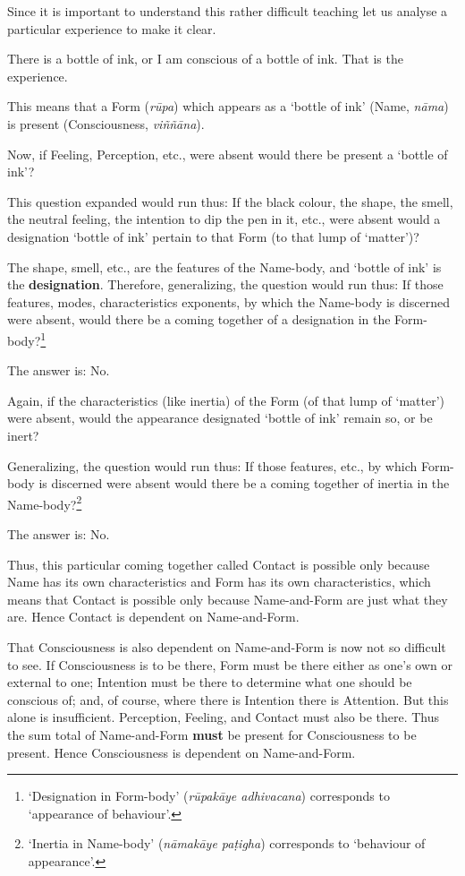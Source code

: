 Since it is important to understand this rather difficult teaching let us analyse a particular experience to make it clear.

There is a bottle of ink, or I am conscious of a bottle of ink. That is the experience.

This means that a Form (\emph{rūpa}) which appears as a `bottle of ink' (Name, \emph{nāma}) is present (Consciousness, \emph{viññāna}).

Now, if Feeling, Perception, etc., were absent would there be present a `bottle of ink'?

This question expanded would run thus: If the black colour, the shape, the smell, the neutral feeling, the intention to dip the pen in it, etc., were absent would a designation `bottle of ink' pertain to that Form (to that lump of `matter')?

The shape, smell, etc., are the features of the Name-body, and `bottle of ink' is the \textbf{designation}. Therefore, generalizing, the question would run thus: If those features, modes, characteristics exponents, by which the Name-body is discerned were absent, would there be a coming together of a designation in the Form-body?\footnote{`Designation in Form-body' (\emph{rūpakāye adhivacana}) corresponds to `appearance of behaviour'.}

The answer is: No.

Again, if the characteristics (like inertia) of the Form (of that lump of `matter') were absent, would the appearance designated `bottle of ink' remain so, or be inert?

Generalizing, the question would run thus: If those features, etc., by which Form-body is discerned were absent would there be a coming together of inertia in the Name-body?\footnote{`Inertia in Name-body' (\emph{nāmakāye paṭigha}) corresponds to `behaviour of appearance'.}

The answer is: No.

Thus, this particular coming together called Contact is possible only because Name has its own characteristics and Form has its own characteristics, which means that Contact is possible only because Name-and-Form are just what they are. Hence Contact is dependent on Name-and-Form.

That Consciousness is also dependent on Name-and-Form is now not so difficult to see. If Consciousness is to be there, Form must be there either as one's own or external to one; Intention must be there to determine what one should be conscious of; and, of course, where there is Intention there is Attention. But this alone is insufficient. Perception, Feeling, and Contact must also be there. Thus the sum total of Name-and-Form \textbf{must} be present for Consciousness to be present. Hence Consciousness is dependent on Name-and-Form.

